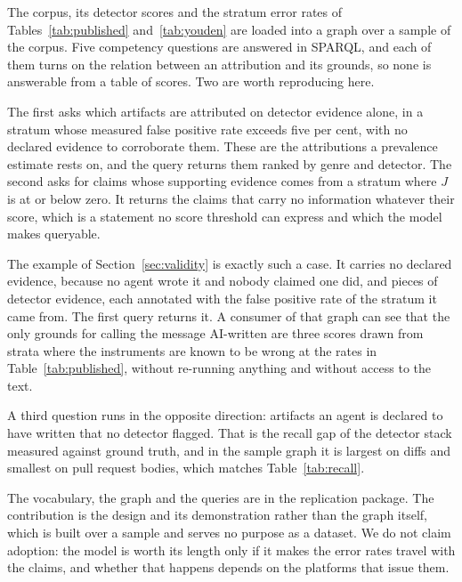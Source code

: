 The corpus, its detector scores and the stratum error rates of
Tables~\ref{tab:published} and~\ref{tab:youden} are loaded into a graph over a sample of the
corpus. Five competency questions are answered in SPARQL, and each of them turns on the
relation between an attribution and its grounds, so none is answerable from a table of
scores. Two are worth reproducing here.

The first asks which artifacts are attributed on detector evidence alone, in a stratum
whose measured false positive rate exceeds five per cent, with no declared evidence to
corroborate them. These are the attributions a prevalence estimate rests on, and the
query returns them ranked by genre and detector. The second asks for claims whose
supporting evidence comes from a stratum where $J$ is at or below zero. It returns the
claims that carry no information whatever their score, which is a statement no score
threshold can express and which the model makes queryable.

The example of Section~\ref{sec:validity} is exactly such a case. It carries no declared
evidence, because no agent wrote it and nobody claimed one did, and \ExFlagged{} pieces
of detector evidence, each annotated with the false positive rate of the stratum it came
from. The first query returns it. A consumer of that graph can see that the only grounds
for calling the message AI-written are three scores drawn from strata where the
instruments are known to be wrong at the rates in Table~\ref{tab:published}, without
re-running anything and without access to the text.

A third question runs in the opposite direction: artifacts an agent is declared to have
written that no detector flagged. That is the recall gap of the detector stack measured
against ground truth, and in the sample graph it is largest on diffs and smallest on
pull request bodies, which matches Table~\ref{tab:recall}.

The vocabulary, the graph and the queries are in the replication package. The
contribution is the design and its demonstration rather than the graph itself, which is
built over a sample and serves no purpose as a dataset. We do not claim adoption: the
model is worth its length only if it makes the error rates travel with the claims, and
whether that happens depends on the platforms that issue them.
